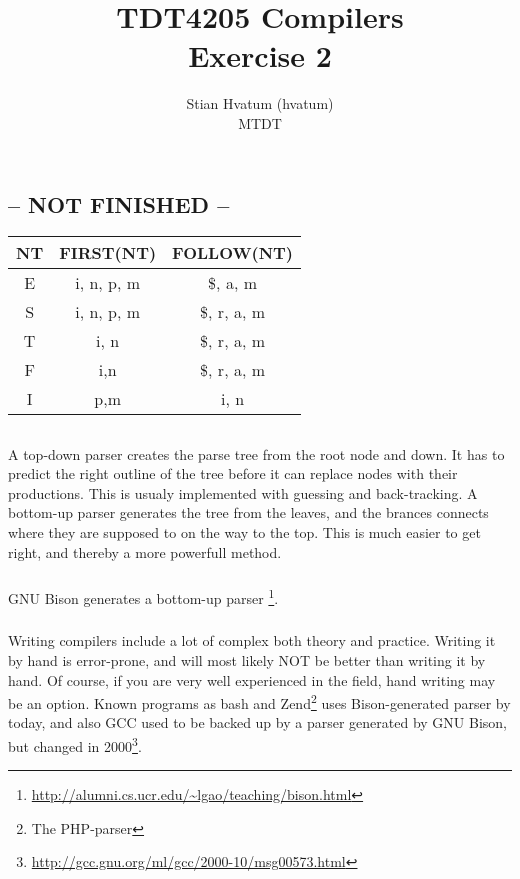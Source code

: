 \documentclass{article}
\title{TDT4205 Compilers\\
\Huge Exercise 2}
\author{Stian Hvatum (hvatum)\\MTDT}
\begin{document}
\maketitle

\section{}
\subsection{ -- NOT FINISHED -- }
\begin{tabular}{|c|c|c|}
\hline
NT & FIRST(NT) & FOLLOW(NT) \\
\hline
\hline
E & {i, n, p, m} & {\$, a, m} \\
\hline
S & {i, n, p, m} & {\$, r, a, m}\\
\hline
T & {i, n} & {\$, r, a, m}\\
\hline
F & {i,n} & {\$, r, a, m} \\
\hline
I & {p,m} & {i, n} \\
\hline
\end{tabular}

\subsection{}
\subsubsection{}
A top-down parser creates the parse tree from the root node and down. It has to
predict the right outline of the tree before it can replace nodes with their
productions. This is usualy implemented with guessing and back-tracking. A
bottom-up parser generates the tree from the leaves, and the brances connects where they are supposed to on the way to the top. This is much
easier to get right, and thereby a more powerfull method.

\subsubsection{}
GNU Bison generates a bottom-up parser
\footnote{\url{http://alumni.cs.ucr.edu/~lgao/teaching/bison.html}}.

\subsubsection{}
Writing compilers include a lot of complex both theory and practice. Writing it
by hand is error-prone, and will most likely NOT be better than writing it by
hand. Of course, if you are very well experienced in the field, hand writing may
be an option. Known programs as {\ttfamily bash} and
{\ttfamily Zend\footnote{The PHP-parser}} uses Bison-generated parser by today,
and also GCC used to be backed up by a parser generated by GNU Bison, but
changed in 2000\footnote{\url{http://gcc.gnu.org/ml/gcc/2000-10/msg00573.html}}.
\end{document}
